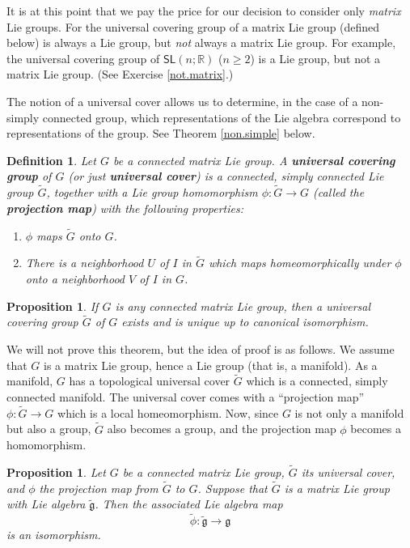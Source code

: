 \documentclass[12pt]{amsbook}
\let \frak = \mathfrak
\theoremstyle{plain}
\newtheorem{definition}[theorem]{Definition}
\newtheorem{proposition}[theorem]{Proposition}
\numberwithin{equation}{chapter}
\numberwithin{theorem}{chapter}
\begin{document}
It is at this point that we pay the price for our decision to consider only
\textit{matrix} Lie groups. For the universal covering group of a matrix Lie
group (defined below) is always a Lie group, but \textit{not} always a matrix
Lie group. For example, the universal covering group of $\mathsf{SL}\left(
n;\mathbb{R}\right)  $ ($n\ge2$) is a Lie group, but not a matrix Lie group.
(See Exercise \ref{not.matrix}.)

The notion of a universal cover allows us to determine, in the case of a
non-simply connected group, which representations of the Lie algebra
correspond to representations of the group. See Theorem \ref{non.simple} below.

\begin{definition}
Let $G$ be a connected matrix Lie group. A \textbf{universal covering group}
of $G$ (or just \textbf{universal cover}) is a connected, simply connected Lie
group $\widetilde{G}$, together with a Lie group homomorphism $\phi
:\widetilde{G}\rightarrow G$ (called the \textbf{projection map}) with the
following properties:

\begin{enumerate}
\item $\phi$ maps $\widetilde{G}$ onto $G$.

\item  There is a neighborhood $U$ of $I$ in $\widetilde{G}$ which maps
homeomorphically under $\phi$ onto a neighborhood $V$ of $I$ in $G$.
\end{enumerate}
\end{definition}

\begin{proposition}
If $G$ is any connected matrix Lie group, then a universal covering group
$\widetilde{G}$ of $G$ exists and is unique up to canonical isomorphism.
\end{proposition}

We will not prove this theorem, but the idea of proof is as follows. We assume
that $G$ is a matrix Lie group, hence a Lie group (that is, a manifold). As a
manifold, $G$ has a topological universal cover $\widetilde{G}$ which is a
connected, simply connected manifold. The universal cover comes with a
``projection map'' $\phi:\widetilde{G}\rightarrow G$ which is a local
homeomorphism. Now, since $G$ is not only a manifold but also a group,
$\widetilde{G}$ also becomes a group, and the projection map $\phi$ becomes a homomorphism.

\begin{proposition}
\label{cover.iso}Let $G$ be a connected matrix Lie group, $\widetilde{G}$ its
universal cover, and $\phi$ the projection map from $\widetilde{G}$ to $G$.
Suppose that $\widetilde{G}$ is a matrix Lie group with Lie algebra
$\widetilde{\frak{g}}$. Then the associated Lie algebra map
\[
\widetilde{\phi}:\widetilde{\frak{g}}\rightarrow\frak{g}%
\]
is an isomorphism.
\end{proposition}
\end{document}
